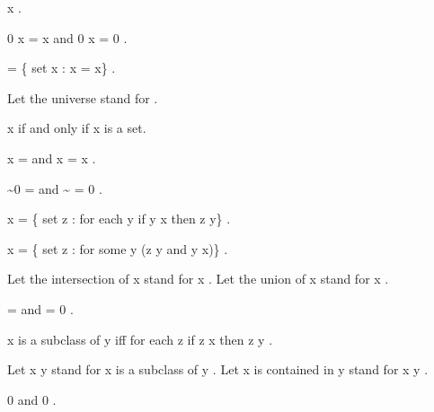 \documentclass[a4paper,draft]{amsproc}
\begin{document}
\begin{forthel}
\begin{theorem}
 x  .
\end{theorem}

\begin{theorem}
 0 \cup x = x  and  0 \cap x = 0 .
\end{theorem}

\begin{definition}
	  = \{ set  x : x = x\} .
\end{definition}
Let the universe stand for   .

\begin{theorem}
 x \in {}  if and only if  x  is a set.
\end{theorem}

\begin{theorem}
 x \cup {} =   and  x \cap {} = x .
\end{theorem}

\begin{theorem}
 \sim 0 =   and  \sim {} = 0 .
\end{theorem}

\begin{definition}  \bigcap x = 
\{ set  z :  for each  y  if  y \in x  then  z \in y\} .\end{definition}

\begin{definition}  \bigcup x = 
\{ set  z :  for some  y   (z \in y  and  y \in x)\} .\end{definition}

Let the intersection of  x  stand for  \bigcap x .
Let the union of  x  stand for  \bigcup x .

\begin{theorem}
  =   and   = 0 .
\end{theorem}

\begin{definition}  x  is a subclass of  y  iff 
for each  z  if  z \in x  then  z \in y .
\end{definition}

Let  x \subset y  stand for  x  is a subclass of  y .
Let  x  is contained in  y  stand for  x \subset y .

\begin{lemma*}
 0   and  0  .
\end{lemma*}


\end{forthel}
\end{document}
